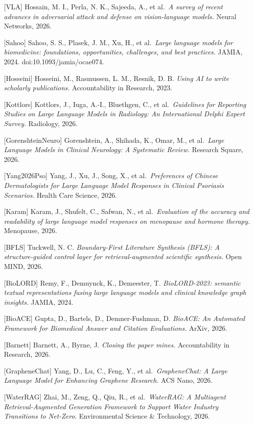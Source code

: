 {[}VLA{]} Hossain, M. I., Perla, N. K., Sajeeda, A., et al.~\emph{A survey of recent advances in adversarial attack and defense on vision-language models.} Neural Networks, 2026.

{[}Sahoo{]} Sahoo, S. S., Plasek, J. M., Xu, H., et al.~\emph{Large language models for biomedicine: foundations, opportunities, challenges, and best practices.} JAMIA, 2024. doi:10.1093/jamia/ocae074.

{[}Hosseini{]} Hosseini, M., Rasmussen, L. M., Resnik, D. B. \emph{Using AI to write scholarly publications.} Accountability in Research, 2023.

{[}Kottlors{]} Kottlors, J., Iuga, A.-I., Bluethgen, C., et al.~\emph{Guidelines for Reporting Studies on Large Language Models in Radiology: An International Delphi Expert Survey.} Radiology, 2026.

{[}GorenshteinNeuro{]} Gorenshtein, A., Shihada, K., Omar, M., et al.~\emph{Large Language Models in Clinical Neurology: A Systematic Review.} Research Square, 2026.

{[}Yang2026Pso{]} Yang, J., Xu, J., Song, X., et al.~\emph{Preferences of Chinese Dermatologists for Large Language Model Responses in Clinical Psoriasis Scenarios.} Health Care Science, 2026.

{[}Karam{]} Karam, J., Shufelt, C., Safwan, N., et al.~\emph{Evaluation of the accuracy and readability of large language model responses on menopause and hormone therapy.} Menopause, 2026.

{[}BFLS{]} Tuckwell, N. C. \emph{Boundary-First Literature Synthesis (BFLS): A structure-guided control layer for retrieval-augmented scientific synthesis.} Open MIND, 2026.

{[}BioLORD{]} Remy, F., Demuynck, K., Demeester, T. \emph{BioLORD-2023: semantic textual representations fusing large language models and clinical knowledge graph insights.} JAMIA, 2024.

{[}BioACE{]} Gupta, D., Bartels, D., Demner-Fushman, D. \emph{BioACE: An Automated Framework for Biomedical Answer and Citation Evaluations.} ArXiv, 2026.

{[}Barnett{]} Barnett, A., Byrne, J. \emph{Closing the paper mines.} Accountability in Research, 2026.

{[}GrapheneChat{]} Yang, D., Lu, C., Feng, Y., et al.~\emph{GrapheneChat: A Large Language Model for Enhancing Graphene Research.} ACS Nano, 2026.

{[}WaterRAG{]} Zhai, M., Zeng, Q., Qiu, R., et al.~\emph{WaterRAG: A Multiagent Retrieval-Augmented Generation Framework to Support Water Industry Transitions to Net-Zero.} Environmental Science \& Technology, 2026.

